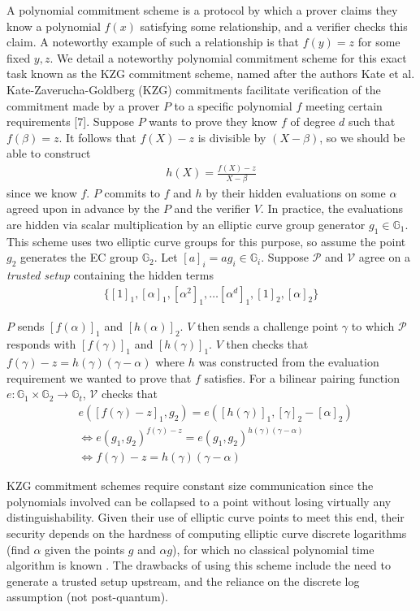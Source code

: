 \noindent A polynomial commitment scheme is a protocol by which a prover claims they know a polynomial $f(x)$ satisfying some relationship, and a verifier checks this claim. A noteworthy example of such a relationship is that $f(y) = z$ for some fixed $y, z$. We detail a noteworthy polynomial commitment scheme for this exact task known as the KZG commitment scheme, named after the authors Kate et al. Kate-Zaverucha-Goldberg (KZG) commitments facilitate verification of the commitment made by a prover $P$ to a specific polynomial $f$ meeting certain requirements [7]. Suppose $P$ wants to prove they know $f$ of degree $d$ such that $f(\beta) = z$. It follows that $f(X) - z$ is divisible by $(X - \beta)$, so we should be able to construct
\begin{align}
h(X) = \frac{f(X) - z}{X - \beta}
\end{align}
since we know $f$. $P$ commits to $f$ and $h$ by their hidden evaluations on some $\alpha$ agreed upon in advance by the $P$ and the verifier $V$. In practice, the evaluations are hidden via scalar multiplication by an elliptic curve group generator $g_1 \in \mathbb{G}_1$. This scheme uses two elliptic curve groups for this purpose, so assume the point $g_2$ generates the EC group $\mathbb{G}_2$. Let $[a]_i = ag_i \in \mathbb{G}_i$. Suppose $\mathcal{P}$ and $\mathcal{V}$ agree on a \textit{trusted setup} containing the hidden terms 
\begin{align}
\{[1]_1, [\alpha]_1, [\alpha^2]_1, \dots [\alpha^{d}]_1, [1]_2, [\alpha]_2\}
\end{align}

$P$ sends $[f(\alpha)]_1$ and $[h(\alpha)]_2$. $V$ then sends a challenge point $\gamma$ to which $\mathcal{P}$ responds with $[f(\gamma)]_1$ and $[h(\gamma)]_1$. $V$ then checks that $f(\gamma) - z = h(\gamma)(\gamma - \alpha)$ where $h$ was constructed from the evaluation requirement we wanted to prove that $f$ satisfies. For a bilinear pairing function $e : \mathbb{G}_1 \times \mathbb{G}_2 \to \mathbb{G}_t$, $\mathcal{V}$ checks that 
\begin{align}
&e([f(\gamma) - z]_1, g_2) = e([h(\gamma)]_1, [\gamma]_2 - [\alpha]_2) \\
&\Leftrightarrow e(g_1, g_2)^{f(\gamma) - z} = e(g_1, g_2)^{h(\gamma)(\gamma - \alpha)} \\
&\Leftrightarrow  f(\gamma) - z = h(\gamma)(\gamma - \alpha)
\end{align}

\noindent KZG commitment schemes require constant size communication since the polynomials involved can be collapsed to a point without losing virtually any distinguishability. Given their use of elliptic curve points to meet this end, their security depends on the hardness of computing elliptic curve discrete logarithms (find $\alpha$ given the points $g$ and $\alpha g$), for which no classical polynomial time algorithm is known \cite{ecdlp}. The drawbacks of using this scheme include the need to generate a trusted setup upstream, and the reliance on the discrete log assumption (not post-quantum).\\


